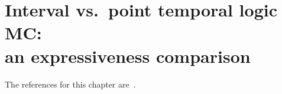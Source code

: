 \chapter[Interval vs.\ point logic MC: an expressiveness comparison]{Interval vs.\ point temporal logic MC: \\ an expressiveness comparison}\label{chap:TOCL17}
\begin{chapref}
The references for this chapter are~\cite{tocl18,fsttcs16}.
\end{chapref}

\minitoc\mtcskip

\newcommand{\stat}{\mathsf{st}}
\newcommand{\LinearPast}{\mathsf{ct}}
\newcommand{\LinearTime}{\mathsf{lin}}

\newcommand{\act}{{\textit{act}}}







